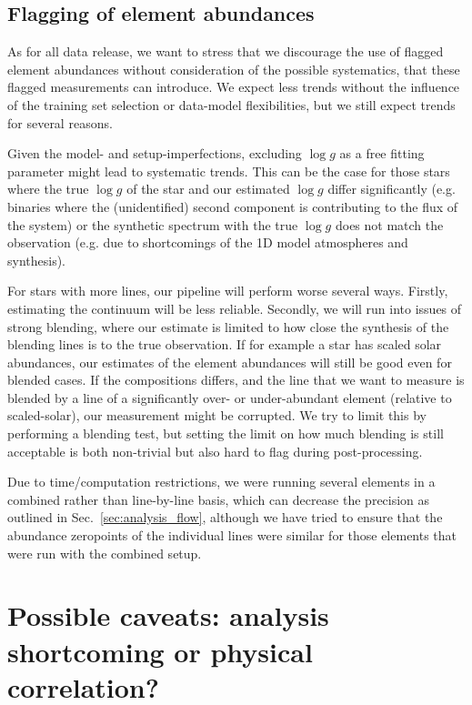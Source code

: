 \documentclass[fleqn,usenatbib,useAMS]{mnras}
\newcommand{\logg}{$\log g$\xspace}
\begin{document}
\subsection{Flagging of element abundances}

As for all data release, we want to stress that we discourage the use of flagged element abundances without consideration of the possible systematics, that these flagged measurements can introduce. We expect less trends without the influence of the training set selection or data-model flexibilities, but we still expect trends for several reasons.

Given the model- and setup-imperfections, excluding \logg as a free fitting parameter might lead to systematic trends. This can be the case for those stars where the true \logg of the star and our estimated \logg differ significantly (e.g. binaries where the (unidentified) second component is contributing to the flux of the system) or the synthetic spectrum with the true \logg does not match the observation (e.g. due to shortcomings of the 1D model atmospheres and synthesis).

For stars with more lines, our pipeline will perform worse several ways. Firstly, estimating the continuum will be less reliable. Secondly, we will run into issues of strong blending, where our estimate is limited to how close the synthesis of the blending lines is to the true observation. If for example a star has scaled solar abundances, our estimates of the element abundances will still be good even for blended cases. If the compositions differs, and the line that we want to measure is blended by a line of a significantly over- or under-abundant element (relative to scaled-solar), our measurement might be corrupted. We try to limit this by performing a blending test, but setting the limit on how much blending is still acceptable is both non-trivial but also hard to flag during post-processing.

Due to time/computation restrictions, we were running several elements in a combined rather than line-by-line basis, which can decrease the precision as outlined in Sec.~\ref{sec:analysis_flow}, although we have tried to ensure that the abundance zeropoints of the individual lines were similar for those elements that were run with the combined setup.

\section{Possible caveats: analysis shortcoming or physical correlation?} \label{sec:caveats}
\end{document}
